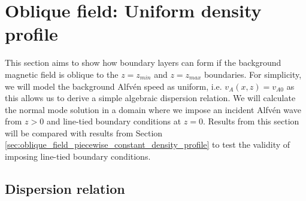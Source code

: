 \section{Oblique field: Uniform density profile}
\label{sec:oblique_field_uniform_density_profile_with_line_tied_bcs}

This section aims to show how boundary layers can form if the background magnetic field is oblique to the $z=z_{min}$ and $z=z_{max}$ boundaries. For simplicity, we will model the background Alfv\'en speed as uniform, i.e. $v_A(x,z)=v_{A0}$ as this allows us to derive a simple algebraic dispersion relation. We will calculate the normal mode solution in a domain where we impose an incident Alfv\'en wave from $z>0$ and line-tied boundary conditions at $z=0$. Results from this section will be compared with results from Section \ref{sec:oblique_field_piecewise_constant_density_profile} to test the validity of imposing line-tied boundary conditions.

\subsection{Dispersion relation}

